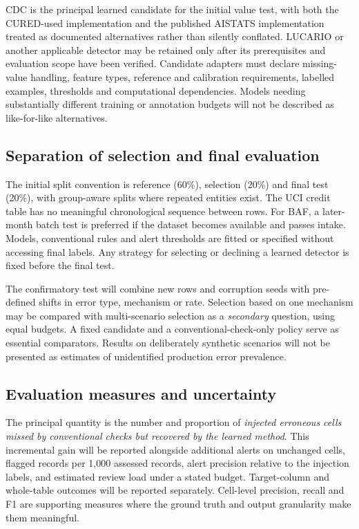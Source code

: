 \documentclass[10pt,a4paper]{article}
\begin{document}
CDC is the principal learned candidate for the initial value test, with both the CURED-used implementation and the published AISTATS implementation treated as documented alternatives rather than silently conflated. LUCARIO or another applicable detector may be retained only after its prerequisites and evaluation scope have been verified. Candidate adapters must declare missing-value handling, feature types, reference and calibration requirements, labelled examples, thresholds and computational dependencies. Models needing substantially different training or annotation budgets will not be described as like-for-like alternatives.

\subsection{Separation of selection and final evaluation}
The initial split convention is reference (60\%), selection (20\%) and final test (20\%), with group-aware splits where repeated entities exist. The UCI credit table has no meaningful chronological sequence between rows. For BAF, a later-month batch test is preferred if the dataset becomes available and passes intake. Models, conventional rules and alert thresholds are fitted or specified without accessing final labels. Any strategy for selecting or declining a learned detector is fixed before the final test.

The confirmatory test will combine new rows and corruption seeds with pre-defined shifts in error type, mechanism or rate. Selection based on one mechanism may be compared with multi-scenario selection as a \emph{secondary} question, using equal budgets. A fixed candidate and a conventional-check-only policy serve as essential comparators. Results on deliberately synthetic scenarios will not be presented as estimates of unidentified production error prevalence.

\subsection{Evaluation measures and uncertainty}
The principal quantity is the number and proportion of \emph{injected erroneous cells missed by conventional checks but recovered by the learned method}. This incremental gain will be reported alongside additional alerts on unchanged cells, flagged records per 1,000 assessed records, alert precision relative to the injection labels, and estimated review load under a stated budget. Target-column and whole-table outcomes will be reported separately. Cell-level precision, recall and F1 are supporting measures where the ground truth and output granularity make them meaningful.
\end{document}
